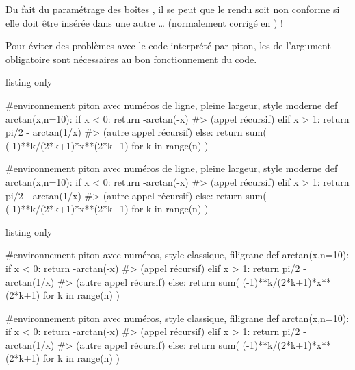 \documentclass[a4paper,french,11pt]{article}
\newcommand\ctex[1]{\tcbox[vignettelatex]{#1}}
\newcommand\cmaj[1]{%
	{\tcbox[vignetteMaJ]{#1}\xspace}%
}
\begin{document}
\begin{noteblock}
Du fait du paramétrage des boîtes \ctex{tcolorbox}, il se peut que le rendu soit non conforme si elle doit être insérée dans une autre \ctex{tcolorbox}\ldots{} (normalement corrigé en \cmaj{2.6.9}) !
\end{noteblock}

\begin{noteblock}
Pour éviter des problèmes avec le code interprété par \textsf{piton}, les \ctex{\{\}} de l'argument obligatoire sont nécessaires au bon fonctionnement du code.
\end{noteblock}

\begin{PresCodeTexPL}{listing only}
\begin{CodePiton}{}
#environnement piton avec numéros de ligne, pleine largeur, style moderne
def arctan(x,n=10):
	if x < 0:
		return -arctan(-x) #> (appel récursif)
	elif x > 1:
		return pi/2 - arctan(1/x) #> (autre appel récursif)
	else:
		return sum( (-1)**k/(2*k+1)*x**(2*k+1) for k in range(n) )
\end{CodePiton}
\end{PresCodeTexPL}

\begin{CodePiton}{}
#environnement piton avec numéros de ligne, pleine largeur, style moderne
def arctan(x,n=10):
	if x < 0:
		return -arctan(-x) #> (appel récursif)
	elif x > 1:
		return pi/2 - arctan(1/x) #> (autre appel récursif)
	else:
		return sum( (-1)**k/(2*k+1)*x**(2*k+1) for k in range(n) )
\end{CodePiton}

\begin{PresCodeTexPL}{listing only}
\begin{CodePiton}[Style=Classique,Filigrane]{}
#environnement piton avec numéros, style classique, filigrane
def arctan(x,n=10):
	if x < 0:
		return -arctan(-x) #> (appel récursif)
	elif x > 1:
		return pi/2 - arctan(1/x) #> (autre appel récursif)
	else:
		return sum( (-1)**k/(2*k+1)*x**(2*k+1) for k in range(n) )
\end{CodePiton}
\end{PresCodeTexPL}

\begin{CodePiton}[Style=Classique,Filigrane]{}
#environnement piton avec numéros, style classique, filigrane
def arctan(x,n=10):
	if x < 0:
		return -arctan(-x) #> (appel récursif)
	elif x > 1:
		return pi/2 - arctan(1/x) #> (autre appel récursif)
	else:
		return sum( (-1)**k/(2*k+1)*x**(2*k+1) for k in range(n) )
\end{CodePiton}
\end{document}
